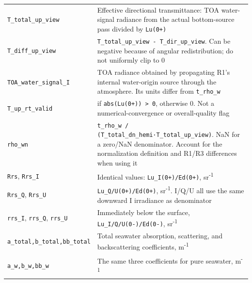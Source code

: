 {\begin{longtable}{@{}>{\raggedright\arraybackslash}p{}>{\raggedright\arraybackslash}p{}@{}}
\texttt{T\_\allowbreak{}total\_\allowbreak{}up\_\allowbreak{}view} & Effective directional transmittance: TOA water-signal radiance from the actual bottom-source pass divided by \texttt{Lu(0+)} \\
\texttt{T\_\allowbreak{}diff\_\allowbreak{}up\_\allowbreak{}view} & \texttt{T\_\allowbreak{}total\_\allowbreak{}up\_\allowbreak{}view - T\_\allowbreak{}dir\_\allowbreak{}up\_\allowbreak{}view}. Can be negative because of angular redistribution; do not uniformly clip to 0 \\
\texttt{TOA\_\allowbreak{}water\_\allowbreak{}signal\_\allowbreak{}I} & TOA radiance obtained by propagating R1's internal water-origin source through the atmosphere. Its units differ from \texttt{t\_\allowbreak{}rho\_\allowbreak{}w} \\
\texttt{T\_\allowbreak{}up\_\allowbreak{}rt\_\allowbreak{}valid} & 1 if \texttt{abs(Lu(0+)) > 0}, otherwise 0. Not a numerical-convergence or overall-quality flag \\
\texttt{rho\_\allowbreak{}wn} & \texttt{t\_\allowbreak{}rho\_\allowbreak{}w /\allowbreak{} (T\_\allowbreak{}total\_\allowbreak{}dn\_\allowbreak{}hemi·T\_\allowbreak{}total\_\allowbreak{}up\_\allowbreak{}view)}. NaN for a zero/NaN denominator. Account for the normalization definition and R1/R3 differences when using it \\
\texttt{Rrs}, \texttt{Rrs\_\allowbreak{}I} & Identical values: \texttt{Lu\_\allowbreak{}I(0+)/\allowbreak{}Ed(0+)}, sr\textsuperscript{-}\textsuperscript{1} \\
\texttt{Rrs\_\allowbreak{}Q}, \texttt{Rrs\_\allowbreak{}U} & \texttt{Lu\_\allowbreak{}Q/\allowbreak{}U(0+)/\allowbreak{}Ed(0+)}, sr\textsuperscript{-}\textsuperscript{1}. I/Q/U all use the same downward I irradiance as denominator \\
\texttt{rrs\_\allowbreak{}I}, \texttt{rrs\_\allowbreak{}Q}, \texttt{rrs\_\allowbreak{}U} & Immediately below the surface, \texttt{Lu\_\allowbreak{}I/\allowbreak{}Q/\allowbreak{}U(0-)/\allowbreak{}Ed(0-)}, sr\textsuperscript{-}\textsuperscript{1} \\
\texttt{a\_\allowbreak{}total,\allowbreak{}b\_\allowbreak{}total,\allowbreak{}bb\_\allowbreak{}total} & Total seawater absorption, scattering, and backscattering coefficients, m\textsuperscript{-}\textsuperscript{1} \\
\texttt{a\_\allowbreak{}w,\allowbreak{}b\_\allowbreak{}w,\allowbreak{}bb\_\allowbreak{}w} & The same three coefficients for pure seawater, m\textsuperscript{-}\textsuperscript{1} \\

\end{longtable}}
